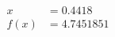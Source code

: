 \documentclass[preview]{standalone}
\begin{document}
\begin{align*}
x &= 0.4418\\f(x) &= 4.7451851
\end{align*}
\end{document}
